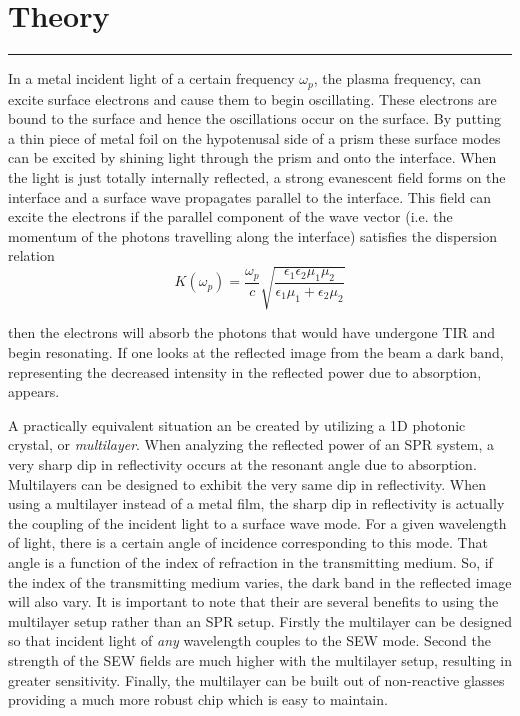 \documentclass{report}
\begin{document}
	\section*{Theory}
	\vspace{-0.1cm}\hrule\vspace{0.2cm}
	\par{In a metal incident light of a certain frequency $\omega_p$, the plasma frequency, can excite surface electrons and cause them to begin oscillating. These electrons are bound to the surface and hence the oscillations occur on the surface. By putting a thin piece of metal foil on the hypotenusal side of a prism these surface modes can be excited by shining light through the prism and onto the interface. When the light is just totally internally reflected, a strong evanescent field forms on the interface and a surface wave propagates parallel to the interface. This field can excite the electrons if the parallel component of the wave vector (i.e. the momentum of the photons travelling along the interface) satisfies the dispersion relation}
\[
	K(\omega_p) = \frac{\omega_p}{c} \sqrt{\frac{\epsilon_1\epsilon_2\mu_1\mu_2}{\epsilon_1\mu_1 + \epsilon_2\mu_2}}
\]
	\par{then the electrons will absorb the photons that would have undergone TIR and begin resonating. If one looks at the reflected image from the beam a dark band, representing the decreased intensity in the reflected power due to absorption, appears.}
	\par{A practically equivalent situation an be created by utilizing a 1D photonic crystal, or \textit{multilayer}. When analyzing the reflected power of an SPR system, a very sharp dip in reflectivity occurs at the resonant angle due to absorption. Multilayers can be designed to exhibit the very same dip in reflectivity. When using a multilayer instead of a metal film, the sharp dip in reflectivity is actually the coupling of the incident light to a surface wave mode. For a given wavelength of light, there is a certain angle of incidence corresponding to this mode. That angle is a function of the index of refraction in the transmitting medium. So, if the index of the transmitting medium varies, the dark band in the reflected image will also vary. It is important to note that their are several benefits to using the multilayer setup rather than an SPR setup. Firstly the multilayer can be designed so that incident light of \textit{any} wavelength couples to the SEW mode. Second the strength of the SEW fields are much higher with the multilayer setup, resulting in greater sensitivity. Finally, the multilayer can be built out of non-reactive glasses providing a much more robust chip which is easy to maintain.}
\end{document}
